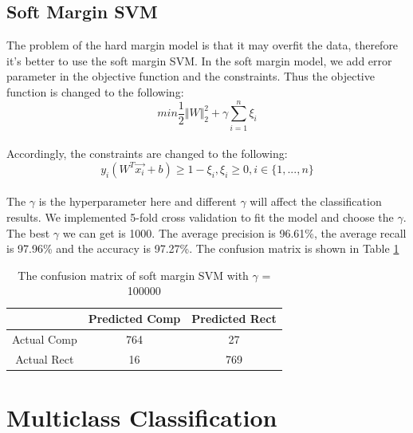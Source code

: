 \documentclass{article}
\begin{document}
\subsection{Soft Margin SVM}
The problem of the hard margin model is that it may overfit the data, therefore it's better to use the soft margin SVM. In the soft margin model, we add error parameter in the objective function and the constraints. Thus the objective function is changed to the following:
\begin{equation*}
min \frac{1}{2}\Vert W \Vert _2 ^2 + \gamma\sum_{i=1}^{n}\xi _i
\end{equation*}
\\
Accordingly, the constraints are changed to the following:
\begin{equation*}
y_i(W^T\overrightarrow{x_i}+b)\geq 1-\xi _i,  \xi _i \geq0,  i\in\lbrace 1, ..., n \rbrace
\end{equation*}
\\
The $\gamma$ is the hyperparameter here and different $\gamma$ will affect the classification results. We implemented 5-fold cross validation to fit the model and choose the $\gamma$.  The best $\gamma$ we can get is 1000. The average precision is 96.61\%, the average recall is 97.96\% and the accuracy is 97.27\%. The confusion matrix is shown in Table \ref{tb:confu_soft}
\begin{table}
\begin{center}
\caption{The confusion matrix of soft margin SVM with $\gamma$ = 100000}
\label{tb:confu_soft}
\begin{tabular}{|c|c|c|}
\hline
& Predicted Comp& Predicted Rect\\
\hline
Actual Comp&764&27\\
\hline
Actual Rect&16&769\\
\hline 	
\end{tabular}
\end{center}
\end{table}
\section{Multiclass Classification}\label{sec:multi}
\end{document}
